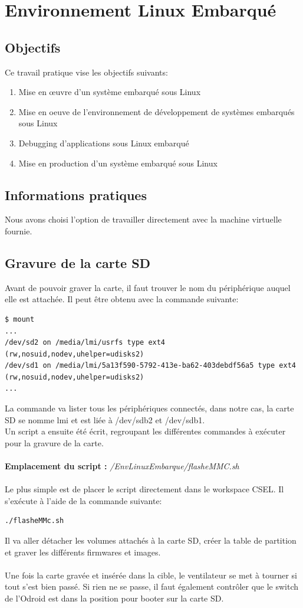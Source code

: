 \section{Environnement Linux Embarqué}
\subsection{Objectifs}
\noindent
Ce travail pratique vise les objectifs suivants:
\begin{enumerate}
	\item Mise en œuvre d'un système embarqué sous Linux
	\item Mise en oeuve de l'environnement de développement de systèmes embarqués sous Linux
	\item Debugging d'applications sous Linux embarqué
	\item Mise en production d'un système embarqué sous Linux
\end{enumerate}
\subsection{Informations pratiques}
Nous avons choisi l'option de travailler directement avec la machine virtuelle fournie.
\subsection{Gravure de la carte SD}
Avant de pouvoir graver la carte, il faut trouver le nom du périphérique auquel elle est attachée. Il peut être obtenu avec la commande suivante:
\begin{lstlisting}
$ mount
...
/dev/sd2 on /media/lmi/usrfs type ext4 (rw,nosuid,nodev,uhelper=udisks2)
/dev/sd1 on /media/lmi/5a13f590-5792-413e-ba62-403debdf56a5 type ext4 (rw,nosuid,nodev,uhelper=udisks2)
...
\end{lstlisting}
La commande va lister tous les périphériques connectés, dans notre cas, la carte SD se nomme lmi et est liée à /dev/sdb2 et /dev/sdb1.\\
Un script a ensuite été écrit, regroupant les différentes commandes à exécuter pour la gravure de la carte.\\\\
\textbf{Emplacement du script : } \textit{/EnvLinuxEmbarque/flasheMMC.sh}\\\\
Le plus simple est de placer le script directement dans le workspace CSEL. Il s'exécute à l'aide de la commande suivante:
\begin{lstlisting}
./flasheMMc.sh
\end{lstlisting}
Il va aller détacher les volumes attachés à la carte SD, créer la table de partition et graver les différents firmwares et images.\\
\\
Une fois la carte gravée et insérée dans la cible, le ventilateur se met à tourner si tout s’est bien passé. Si rien ne se passe, il faut également contrôler que le switch de l’Odroid est dans la position pour booter sur la carte SD.
